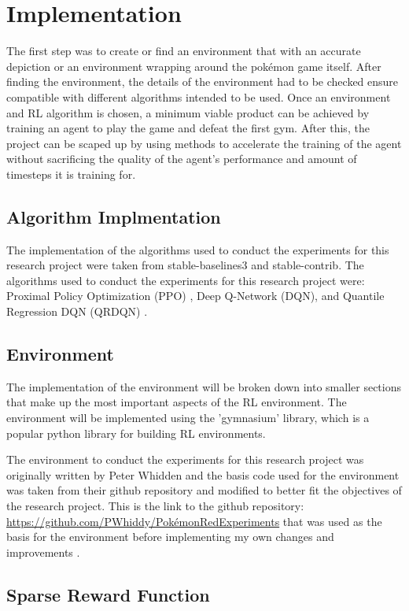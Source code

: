 \section{Implementation}

The first step was to create or find an environment that with an accurate depiction or an environment wrapping around the pokémon game itself. After finding the environment, the details of the environment had to be checked ensure compatible with different algorithms intended to be used. Once an environment and RL algorithm is chosen, a minimum viable product can be achieved by training an agent to play the game and defeat the first gym. After this,  the project can be scaped up by using methods to accelerate the training of the agent without sacrificing the quality of the agent's performance and amount of timesteps it is training for. 

\subsection{Algorithm Implmentation}

The implementation of the algorithms used to conduct the experiments for this research project were taken from stable-baselines3 and stable-contrib. The algorithms used to conduct the experiments for this research project were: Proximal Policy Optimization (PPO) , Deep Q-Network (DQN), and Quantile Regression DQN (QRDQN) \cite{stablebaselines3}. 

\subsection{Environment}

The implementation of the environment will be broken down into smaller sections that make up the most important aspects of the RL environment. The environment will be implemented using the 'gymnasium' library, which is a popular python library for building RL environments.

The environment to conduct the experiments for this research project was originally written by Peter Whidden and the basis code used for the environment was taken from their github repository and modified to better fit the objectives of the research project. This is the link to the github repository: \url{https://github.com/PWhiddy/PokémonRedExperiments} that was used as the basis for the environment before implementing my own changes and improvements \cite{PWhiddy2023}.

\subsection{Sparse Reward Function}

